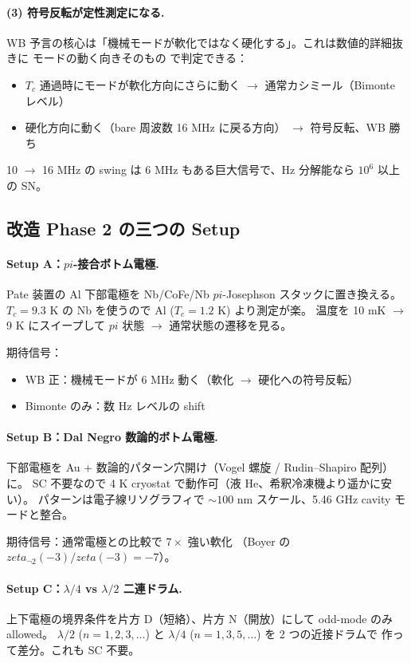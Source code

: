 \documentclass[11pt,a4paper]{article}
\def\pi{pi}%
\def\zeta{zeta}%
\def\textbf#1{#1}%
\begin{document}
\paragraph{(3) 符号反転が定性測定になる.}
WB 予言の核心は「機械モードが軟化ではなく硬化する」。これは数値的詳細抜きに
\textbf{モードの動く向きそのもの} で判定できる：

\begin{itemize}
\item $T_c$ 通過時にモードが軟化方向にさらに動く $\to$ 通常カシミール（Bimonte レベル）
\item 硬化方向に動く（bare 周波数 16 MHz に戻る方向） $\to$ \textbf{符号反転、WB 勝ち}
\end{itemize}

10 $\to$ 16 MHz の swing は 6 MHz もある巨大信号で、Hz 分解能なら $10^6$ 以上の SN。

\subsection{改造 Phase 2 の三つの Setup}

\paragraph{Setup A：$\pi$-接合ボトム電極.}
Pate 装置の Al 下部電極を Nb/CoFe/Nb $\pi$-Josephson スタックに置き換える。
$T_c = 9.3$ K の Nb を使うので Al ($T_c=1.2$ K) より測定が楽。
温度を 10 mK $\to$ 9 K にスイープして $\pi$ 状態 $\to$ 通常状態の遷移を見る。

期待信号：
\begin{itemize}
\item WB 正：機械モードが 6 MHz 動く（軟化 $\to$ 硬化への符号反転）
\item Bimonte のみ：数 Hz レベルの shift
\end{itemize}

\paragraph{Setup B：Dal Negro 数論的ボトム電極.}
下部電極を Au + 数論的パターン穴開け（Vogel 螺旋 / Rudin--Shapiro 配列）に。
SC 不要なので 4 K cryostat で動作可（液 He、希釈冷凍機より遥かに安い）。
パターンは電子線リソグラフィで $\sim 100$ nm スケール、5.46 GHz cavity モードと整合。

期待信号：通常電極との比較で $7\times$ 強い軟化
（Boyer の $\zeta_{\neg 2}(-3)/\zeta(-3) = -7$）。

\paragraph{Setup C：$\lambda/4$ vs $\lambda/2$ 二連ドラム.}
上下電極の境界条件を片方 D（短絡）、片方 N（開放）にして odd-mode のみ allowed。
$\lambda/2$ ($n=1,2,3,\ldots$) と $\lambda/4$ ($n=1,3,5,\ldots$) を 2 つの近接ドラムで
作って差分。これも SC 不要。
\end{document}
